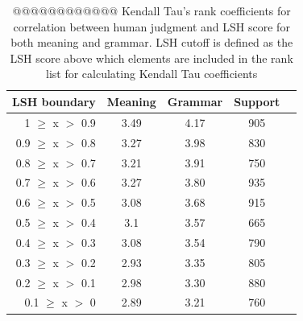 \documentclass[11pt]{article}
\begin{document}

\begin{table}%
\begin{center}
\begin{tabular}{rcccc}%
\hline \hline
\bf \scriptsize LSH boundary & \bf \scriptsize Meaning & \bf \scriptsize Grammar & \bf \scriptsize Support \\ \hline
{\scriptsize 1 $\geq$ x $>$ 0.9} & {\scriptsize 3.49} & {\scriptsize 4.17} & {\scriptsize 905}  \\
{\scriptsize 0.9 $\geq$ x $>$ 0.8} & {\scriptsize 3.27} & {\scriptsize 3.98} & {\scriptsize 830}  \\
{\scriptsize 0.8 $\geq$ x $>$ 0.7} & {\scriptsize 3.21} & {\scriptsize 3.91} & {\scriptsize 750}  \\
{\scriptsize 0.7 $\geq$ x $>$ 0.6} & {\scriptsize 3.27} & {\scriptsize 3.80} & {\scriptsize 935}  \\
{\scriptsize 0.6 $\geq$ x $>$ 0.5} & {\scriptsize 3.08} & {\scriptsize 3.68} & {\scriptsize 915}  \\
{\scriptsize 0.5 $\geq$ x $>$ 0.4} & {\scriptsize 3.1 } & {\scriptsize 3.57} & {\scriptsize 665}  \\
{\scriptsize 0.4 $\geq$ x $>$ 0.3} & {\scriptsize 3.08} & {\scriptsize 3.54} & {\scriptsize 790}  \\
{\scriptsize 0.3 $\geq$ x $>$ 0.2} & {\scriptsize 2.93} & {\scriptsize 3.35} & {\scriptsize 805}  \\
{\scriptsize 0.2 $\geq$ x $>$ 0.1} & {\scriptsize 2.98} & {\scriptsize 3.30} & {\scriptsize 880}  \\
{\scriptsize 0.1 $\geq$ x $>$ 0} & {\scriptsize 2.89} & {\scriptsize 3.21} & {\scriptsize 760}  \\
\hline
\end{tabular}
\end{center}
\caption{\label{table9} @@@@@@@@@@@@ Kendall Tau's rank coefficients for correlation between human judgment and LSH score for both meaning and grammar. LSH cutoff is defined as the LSH score above which elements are included in the rank list for calculating Kendall Tau coefficients}
\end{table}


\end{document}
